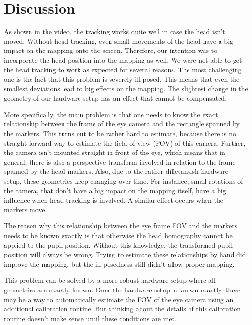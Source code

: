 \section{Discussion}\label{discussion}

As shown in the video, the tracking works quite well in case the head isn't moved. 
Without head tracking, even small movements of the head have a big impact on the mapping onto the screen. 
Therefore, our intention was to incorporate the head position into the mapping as well.
We were not able to get the head tracking to work as expected for several reasons. The most challenging one is the fact that this problem is severely ill-posed. This means that even the smallest deviations lead to big effects on the mapping. The slightest change in the geometry of our hardware setup has an effect that cannot be compensated.

More specifically, the main problem is that one needs to know the exact relationship between the frame of the eye camera and the rectangle spanned by the markers. 
This turns out to be rather hard to estimate, because there is no straight-forward way to estimate the field of view (FOV) of this camera. 
Further, the camera isn't mounted straight in front of the eye, which means that in general, there is also a perspective transform involved in relation to the frame spanned by the head markers. 
Also, due to the rather dilletantish hardware setup, these geometries keep changing over time. 
For instance, small rotations of the camera, that don't have a big impact on the mapping itself, have a big influence when head tracking is involved. 
A similar effect occurs when the markers move. 

The reason why this relationship between the eye frame FOV and the markers needs to be known exactly is that otherwise the head homography cannot be applied to the pupil position. Without this knowledge, the transformed pupil position will always be wrong. Trying to estimate these relationships by hand did improve the mapping, but the ill-posedness still didn't allow proper mapping. 

This problem can be solved by a more robust hardware setup where all geometries are exactly known. 
Once the hardware setup is known exactly, there may be a way to automatically estimate the FOV of the eye camera using an additional calibration routine. 
But thinking about the details of this calibration routine doesn't make sense until these conditions are met.


